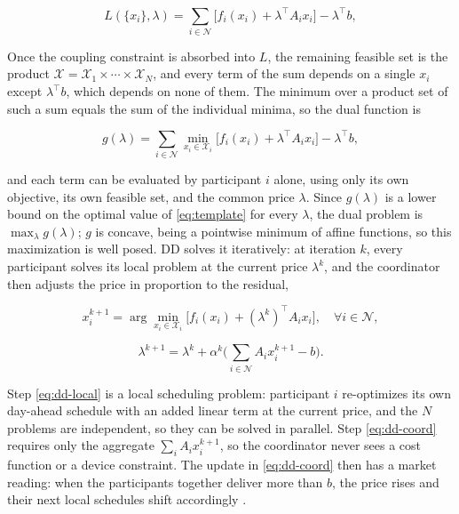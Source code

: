 \documentclass[conference]{IEEEtran}
\begin{document}
\begin{equation}
L(\{x_i\},\lambda) = \sum_{i\in\mathcal{N}} \big[ f_i(x_i) + \lambda^{\top} A_i x_i \big] - \lambda^{\top} b ,
\label{eq:dd-lag}
\end{equation}

Once the coupling constraint is absorbed into $L$, the remaining feasible set is the product $\mathcal{X} = \mathcal{X}_1 \times \cdots \times \mathcal{X}_N$, and every term of the sum depends on a single $x_i$ except $\lambda^{\top} b$, which depends on none of them. The minimum over a product set of such a sum equals the sum of the individual minima, so the dual function is

\begin{equation}
g(\lambda) = \sum_{i\in\mathcal{N}} \min_{x_i\in\mathcal{X}_i} \big[ f_i(x_i) + \lambda^{\top} A_i x_i \big] - \lambda^{\top} b ,
\label{eq:dd-dual}
\end{equation}

and each term can be evaluated by participant $i$ alone, using only its own objective, its own feasible set, and the common price $\lambda$. Since $g(\lambda)$ is a lower bound on the optimal value of \eqref{eq:template} for every $\lambda$, the dual problem is $\max_{\lambda} g(\lambda)$; $g$ is concave, being a pointwise minimum of affine functions, so this maximization is well posed. DD solves it iteratively: at iteration $k$, every participant solves its local problem at the current price $\lambda^{k}$, and the coordinator then adjusts the price in proportion to the residual,

\begin{equation}
x_i^{k+1} = \arg\min_{x_i\in\mathcal{X}_i} \big[ f_i(x_i) + (\lambda^{k})^{\top} A_i x_i \big], \quad \forall i\in\mathcal{N},
\label{eq:dd-local}
\end{equation}

\begin{equation}
\lambda^{k+1} = \lambda^{k} + \alpha^{k}\Big( \sum_{i\in\mathcal{N}} A_i x_i^{k+1} - b \Big).
\label{eq:dd-coord}
\end{equation}

Step \eqref{eq:dd-local} is a local scheduling problem: participant $i$ re-optimizes its own day-ahead schedule with an added linear term at the current price, and the $N$ problems are independent, so they can be solved in parallel. Step \eqref{eq:dd-coord} requires only the aggregate $\sum_i A_i x_i^{k+1}$, so the coordinator never sees a cost function or a device constraint. The update in \eqref{eq:dd-coord} then has a market reading: when the participants together deliver more than $b$, the price rises and their next local schedules shift accordingly \cite{Diekerhof2018}.
\end{document}
